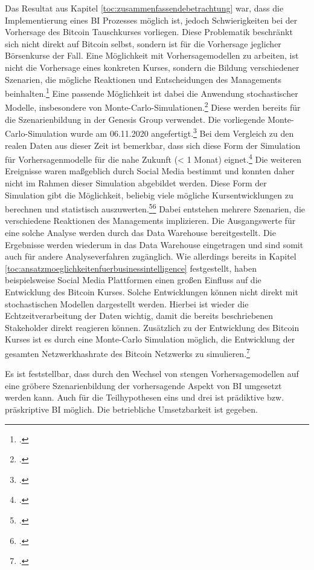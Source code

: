 Das Resultat aus Kapitel \ref{toc:zusammenfassendebetrachtung} war, dass die Implementierung eines \ac{BI} Prozesses möglich ist, jedoch
Schwierigkeiten bei der Vorhersage des Bitcoin Tauschkurses vorliegen. Diese Problematik beschränkt sich nicht direkt auf Bitcoin
selbst, sondern ist für die Vorhersage jeglicher Börsenkurse der Fall. 
Eine Möglichkeit mit Vorhersagemodellen zu arbeiten, ist nicht die Vorhersage eines konkreten
Kurses, sondern die Bildung verschiedener Szenarien, die mögliche Reaktionen und Entscheidungen des Managements beinhalten.\footcite[Vgl.][]{appendix:mcpreis}
Eine passende Möglichkeit ist dabei die Anwendung stochastischer Modelle, insbesondere von Monte-Carlo-Simulationen.\footcite[Vgl.][S. 28]{cocco2016modeling}
Diese werden bereits für die Szenarienbildung in der Genesis Group verwendet. Die vorliegende Monte-Carlo-Simulation wurde
am 06.11.2020 angefertigt.\footcite[Vgl.][]{appendix:mcpreis} Bei dem Vergleich zu den realen Daten aus dieser Zeit ist bemerkbar, dass sich diese Form der Simulation
für Vorhersagenmodelle für die nahe Zukunft (< 1 Monat) eignet.\footcite[Vgl.][]{appendix:btcusd} Die weiteren Ereignisse waren maßgeblich durch Social Media
bestimmt und konnten daher nicht im Rahmen dieser Simulation abgebildet werden.
Diese Form der Simulation gibt die Möglichkeit,
beliebig viele mögliche Kursentwicklungen zu berechnen und statistisch
auszuwerten.\footcite[Vgl.][]{appendix:mcpreis}\footcite[Vgl.][]{appendix:mcszenarien} Dabei entstehen mehrere
Szenarien, die verschiedene Reaktionen des Managements implizieren. Die Ausgangswerte für eine solche Analyse
werden durch das Data Warehouse bereitgestellt. Die Ergebnisse
werden wiederum in das Data Warehouse eingetragen und sind somit auch für andere Analyseverfahren zugänglich. Wie allerdings bereits
in Kapitel \ref{toc:ansatzmoeglichkeitenfuerbusinessintelligence} festgestellt, haben beispielsweise Social Media Plattformen einen
großen Einfluss auf die Entwicklung des Bitcoin Kurses. Solche Entwicklungen können nicht direkt mit stochastischen Modellen dargestellt
werden. Hierbei ist wieder die Echtzeitverarbeitung der Daten wichtig, damit die bereits beschriebenen Stakeholder direkt reagieren können.
Zusätzlich zu der Entwicklung des Bitcoin Kurses ist es durch eine Monte-Carlo Simulation möglich, die Entwicklung der gesamten
Netzwerkhashrate des Bitcoin Netzwerks zu simulieren.\footcite[Vgl.][]{appendix:mchashrate}

Es ist feststellbar, dass durch den Wechsel von stengen Vorhersagemodellen auf eine gröbere Szenarienbildung
der vorhersagende Aspekt von \ac{BI} umgesetzt werden kann. Auch für die Teilhypothesen eins und drei ist prädiktive bzw.
präskriptive \ac{BI} möglich. Die betriebliche Umsetzbarkeit ist gegeben.

